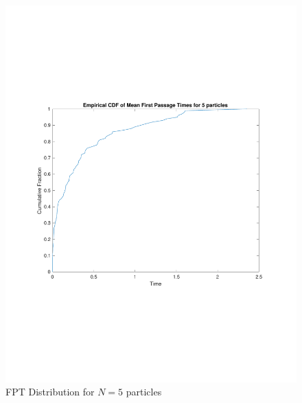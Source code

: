 \documentclass{article}
\begin{document}
\begin{figure}[]
\centering
\includegraphics[scale=0.5]{ECDF5.pdf}
\caption{FPT Distribution for $N=5$ particles}
\label{fig:CDF5}
\end{figure}\begin{figure}[]
\centering

\end{figure}
\end{document}
